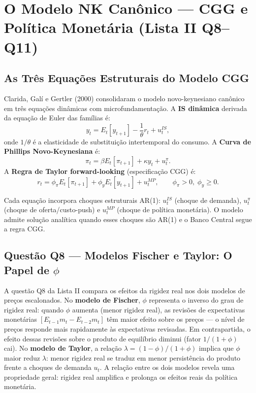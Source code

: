\documentclass[12pt, a4paper]{article}
\begin{document}
\section{O Modelo NK Canônico --- CGG e Política Monetária (Lista II Q8--Q11)}

\subsection{As Três Equações Estruturais do Modelo CGG}

Clarida, Galí e Gertler (2000) consolidaram o modelo novo-keynesiano canônico em três equações dinâmicas com microfundamentação. A \textbf{IS dinâmica} derivada da equação de Euler das famílias é:
\[
y_t = E_t[y_{t+1}] - \frac{1}{\theta}r_t + u_t^{IS},
\]
onde $1/\theta$ é a elasticidade de substituição intertemporal do consumo. A \textbf{Curva de Phillips Novo-Keynesiana} é:
\[
\pi_t = \beta E_t[\pi_{t+1}] + \kappa y_t + u_t^\pi.
\]
A \textbf{Regra de Taylor forward-looking} (especificação CGG) é:
\[
r_t = \phi_\pi E_t[\pi_{t+1}] + \phi_y E_t[y_{t+1}] + u_t^{MP}, \qquad \phi_\pi > 0, \; \phi_y \geq 0.
\]

Cada equação incorpora choques estruturais AR(1): $u_t^{IS}$ (choque de demanda), $u_t^\pi$ (choque de oferta/custo-push) e $u_t^{MP}$ (choque de política monetária). O modelo admite solução analítica quando esses choques são AR(1) e o Banco Central segue a regra CGG.

\subsection{Questão Q8 --- Modelos Fischer e Taylor: O Papel de $\phi$}

A questão Q8 da Lista II compara os efeitos da rigidez real nos dois modelos de preços escalonados. No \textbf{modelo de Fischer}, $\phi$ representa o inverso do grau de rigidez real: quando $\phi$ aumenta (menor rigidez real), as revisões de expectativas monetárias $[E_{t-1}m_t - E_{t-2}m_t]$ têm maior efeito sobre os preços — o nível de preços responde mais rapidamente às expectativas revisadas. Em contrapartida, o efeito dessas revisões sobre o produto de equilíbrio diminui (fator $1/(1+\phi)$ cai). No \textbf{modelo de Taylor}, a relação $\lambda = (1-\phi)/(1+\phi)$ implica que $\phi$ maior reduz $\lambda$: menor rigidez real se traduz em menor persistência do produto frente a choques de demanda $u_t$. A relação entre os dois modelos revela uma propriedade geral: rigidez real amplifica e prolonga os efeitos reais da política monetária.
\end{document}
